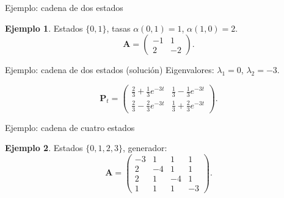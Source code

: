 \documentclass[aspectratio=169]{beamer}
\theoremstyle{plain}
\theoremstyle{definition}
\newtheorem{ejemplo}{Ejemplo}
\newcommand{\A}{\mathbf{A}}
\newcommand{\PP}{\mathbf{P}}
\newcommand{\1}{\mathbf{1}}
\begin{document}
\begin{frame}{Ejemplo: cadena de dos estados}
  \begin{ejemplo}
    Estados $\{0,1\}$, tasas $\alpha(0,1)=1$, $\alpha(1,0)=2$.
    \[ \A = \begin{pmatrix}
      -1 & 1 \\ 2 & -2
    \end{pmatrix}. \]
  \end{ejemplo}

  \begin{center}
  \end{center}
\end{frame}

\begin{frame}{Ejemplo: cadena de dos estados (solución)}
  Eigenvalores: $\lambda_1=0$, $\lambda_2=-3$.

  \[
  \PP_t = \begin{pmatrix}
    \frac23+\frac13 e^{-3t} & \frac13-\frac13 e^{-3t} \\[4pt]
    \frac23-\frac23 e^{-3t} & \frac13+\frac23 e^{-3t}
  \end{pmatrix}.
  \]
\end{frame}

\begin{frame}{Ejemplo: cadena de cuatro estados}
  \begin{ejemplo}
    Estados $\{0,1,2,3\}$, generador:
    \[ \A = \begin{pmatrix}
      -3 & 1 & 1 & 1 \\
      2 & -4 & 1 & 1 \\
      2 & 1 & -4 & 1 \\
      1 & 1 & 1 & -3
    \end{pmatrix}. \]
  \end{ejemplo}
\end{frame}
\end{document}
